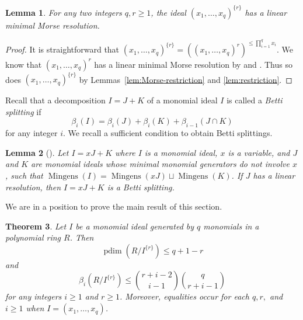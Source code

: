 \documentclass[reqno]{amsart}
\DeclareMathOperator{\mingens}{Mingens}
\DeclareMathOperator{\pdim}{pdim}
\newtheorem{theorem}{Theorem}[section]
\newtheorem{lemma}[theorem]{Lemma}
\theoremstyle{definition}
\theoremstyle{remark}
\numberwithin{equation}{section}
\begin{document}
\begin{lemma}\label{lem:Morse-lcm-power-maximal-ideal}
    For any two integers $q,r\geq 1$, the ideal $(x_1,\dots, x_q)^{\{r\}}$ has a linear minimal Morse resolution.
\end{lemma}

\begin{proof}
    It is straightforward that $(x_1,\dots, x_q)^{\{r\}}=\left((x_1,\dots, x_q)^{r}\right)^{\leq \prod_{i=1}^q x_i}$. We know that $(x_1,\dots, x_q)^{r}$ has a linear minimal Morse resolution by \cite[Fact 5.2]{BW02} and \cite{EliKer}. Thus so does $(x_1,\dots, x_q)^{\{r\}}$ by Lemmas~\ref{lem:Morse-restriction} and \ref{lem:restriction}.
\end{proof}

Recall that a decomposition $I=J+K$ of a monomial ideal $I$ is called a \emph{Betti splitting} if 
\[
\beta_{i}(I) = \beta_{i}(J) + \beta_{i}(K) + \beta_{i-1}(J\cap K)
\]
for any integer $i$. We recall a sufficient condition to obtain Betti splittings.

\begin{lemma}[]\label{lem:betti-splitting}
    Let $I=xJ+K$ where $I$ is a monomial ideal, $x$ is a variable, and $J$ and $K$ are monomial ideals whose minimal monomial generators do not involve $x$, such that $\mingens(I)=\mingens(xJ)\sqcup \mingens(K)$. If $J$ has a linear resolution, then $I=xJ+K$ is a Betti splitting.
\end{lemma}

We are in a position to prove the main result of this section.

\begin{theorem}\label{thm:extremal-Betti}
    Let $I$ be a monomial ideal generated by $q$ monomials in a polynomial ring $R$. Then
    \[
    \pdim(R/I^{\{r\}})\leq q+1-r
    \]
    and
    \[
    \beta_i(R/I^{\{r\}})\leq \binom{r+i-2}{i-1} \binom{q}{r+i-1}
    \]
    for any integers $i\geq 1$ and $r\geq 1$. Moreover, equalities occur for each $q,r,$ and $i\geq 1$ when $I=(x_1,\dots, x_q)$.
\end{theorem}
\end{document}

